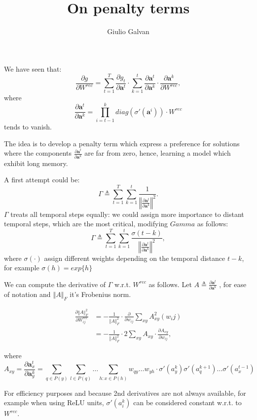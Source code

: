 \documentclass{article}
\title{On penalty terms}
\author{Giulio Galvan}
\renewcommand{\vec}[1]{\boldsymbol{#1}}
\newcommand{\mat}[1]{#1}
\newcommand{\norm}[1]{\left\Vert #1 \right\Vert}
\newcommand{\defeq}{\triangleq}
\begin{document}
	\maketitle

We have seen that:
\begin{equation}
	\frac{\partial g}{\partial \mat{W}^{rec}}= \sum_{t=1}^T\frac{\partial g_t}{\partial \vec{a}^t} \cdot \sum_{k=1}^t \frac{\partial \vec{a}^t}{\partial \vec{a}^k} \cdot \frac{\partial \vec{a}^k}{\partial \mat{W}^{rec}},
\end{equation}
where 
\begin{equation}
	\frac{\partial \vec{a}^t}{\partial \vec{a}^k} = \prod_{i=t-1}^{k}  diag(\sigma'(\vec{a}^i)) \cdot \mat{W}^{rec}
	\label{eq:temporalComponent}
\end{equation}
tends to vanish.

The idea is to develop a penalty term which express a preference for solutions where the components $\frac{\partial \vec{a}^t}{\partial \vec{a}^k}$ are far from zero, hence, learning a model which exhibit long memory.

A first attempt could be:
\begin{equation}
\Gamma \defeq \sum_{t=1}^T\sum_{k=1}^t \frac{1}{\norm{\frac{\partial \vec{a}^t}{\partial \vec{a}^k}}^2}.
\end{equation}
$\Gamma$ treats all temporal steps equally: we could assign more importance to distant temporal steps, which are the most critical, modifying $Gamma$ as follows:
\begin{equation}
\Gamma \defeq \sum_{t=1}^T\sum_{k=1}^t \frac{\sigma(t-k)}{\norm{\frac{\partial \vec{a}^t}{\partial \vec{a}^k}}^2},
\end{equation}
where $\sigma(\cdot)$ assign different weights depending on the temporal distance $t-k$, for example $\sigma(h)=exp\{h\}$

We can compute the derivative of $\Gamma$ w.r.t. $\mat{W}^{rec}$ as follows.
Let $A\defeq\frac{\partial \vec{a}^t}{\partial \vec{a}^k}$	, for ease of notation and $\norm{A}_F$ it's Frobenius norm.

\begin{align}
	\frac{\partial \norm{A}^2_F}{\partial \mat{W}_{ij}^{rec}}&=- \frac{1}{\norm{A}^2_F}\cdot \frac{\partial}{\partial w_{ij}} \sum_{xy} A_{xy}^2(w_ij)\\
	&=- \frac{1}{\norm{A}^2_F}\cdot 2\sum_{xy} A_{xy}\cdot \frac{\partial A_{xy}}{\partial w_{ij}},
\end{align}

where \begin{equation} 
A_{xy}=\frac{\partial \vec{a}_x^t}{\partial \vec{a}_y^k} = \sum_{q\in P(y)} \sum_{l \in P(q)} \hdots \sum_{h : x \in P(h)} w_{qy} \hdots w_{yh} \cdot \sigma'(a_y^k)\sigma'(a_q^{k+1}) \hdots \sigma'(a_x^{t-1})
\label{expanded_mem}
\end{equation}

For efficiency purposes and because 2nd derivatives are not always available, for example when using ReLU units, $\sigma'(a_i^k)$ can be considered constant w.r.t. to $\mat{W^{rec}}$.
\end{document}

